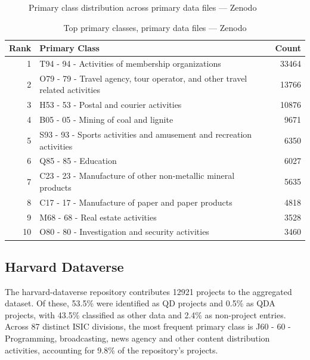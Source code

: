 \clearpage

\begin{figure}[H]
    \centering
    
    \caption{Primary class distribution across primary data files --- Zenodo}
\end{figure}

\begin{table}[H]
    \centering
    \begin{tabular}{r p{10cm} r}
    \hline
    \textbf{Rank} & \textbf{Primary Class} & \textbf{Count} \\
    \hline
    1 & T94 - 94 - Activities of membership organizations & 33464 \\
    2 & O79 - 79 - Travel agency, tour operator, and other travel related activities & 13766 \\
    3 & H53 - 53 - Postal and courier activities & 10876 \\
    4 & B05 - 05 - Mining of coal and lignite & 9671 \\
    5 & S93 - 93 - Sports activities and amusement and recreation activities & 6350 \\
    6 & Q85 - 85 - Education & 6027 \\
    7 & C23 - 23 - Manufacture of other non-metallic mineral products & 5635 \\
    8 & C17 - 17 - Manufacture of paper and paper products & 4818 \\
    9 & M68 - 68 - Real estate activities & 3528 \\
    10 & O80 - 80 - Investigation and security activities & 3460 \\
    \hline
    \end{tabular}
    \caption{Top primary classes, primary data files --- Zenodo}
\end{table}

\clearpage

\subsection{Harvard Dataverse}


The harvard-dataverse repository contributes 12921 projects to the aggregated dataset. Of these, 53.5\% were identified as QD projects and 0.5\% as QDA projects, with 43.5\% classified as other data and 2.4\% as non-project entries. Across 87 distinct ISIC divisions, the most frequent primary class is J60 - 60 - Programming, broadcasting, news agency and other content distribution activities, accounting for 9.8\% of the repository's projects.



